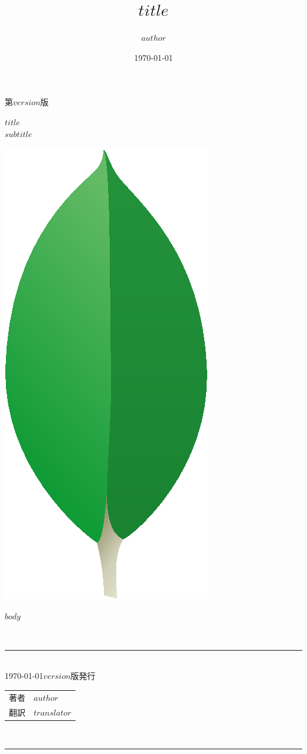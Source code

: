 \documentclass[a4j,oneside,11ptj,uplatex]{jsbook}
\title{$title$}
\author{$author$}
\date{\today}
\begin{document}
\begin{titlepage}
\begin{flushright}
{\sf 第$version$版}
\end{flushright}
\vspace*{3em}
\begin{center}
{\HUGE\gt\sf\textbf{$title$}}
\bigskip\\
{\LARGE\it{$subtitle$}}
\bigskip\\
{\LARGE\gt{}}

\vspace{8em}
\includegraphics{title.eps}
\end{center}

\end{titlepage}

\clearpage

$body$

\clearpage
\thispagestyle{empty}
\vspace*{\fill}

{\noindent\Large\gt{}} \\
\rule[8pt]{14cm}{1pt} \\
{\noindent
\today $version$版発行
\noindent
}
\bigskip\\
\begin{tabular}{ll}
著者 & $author$ \\
翻訳 & $translator$ \\
\end{tabular}
\bigskip\\
\rule[0pt]{14cm}{1pt} \\
\end{document}
